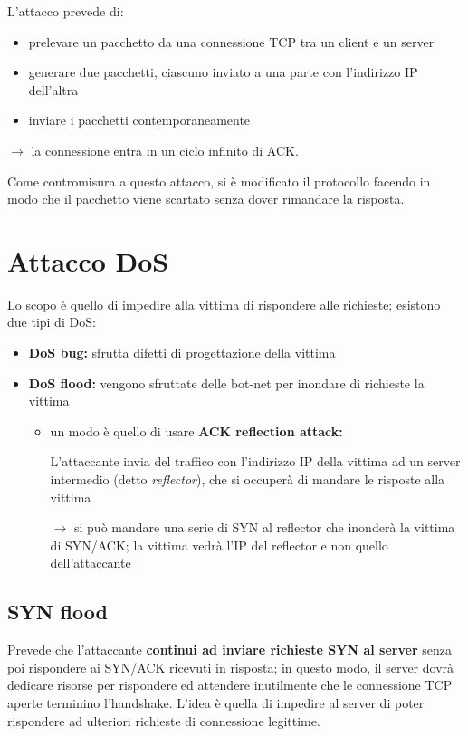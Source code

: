 \noindent L'attacco prevede di:
\begin{itemize}
    \item prelevare un pacchetto da una connessione TCP tra un client e un server 
    \item generare due pacchetti, ciascuno inviato a una parte con l'indirizzo IP dell'altra
    \item inviare i pacchetti contemporaneamente
\end{itemize}

$\rightarrow$ la connessione entra in un ciclo infinito di ACK.

\noindent Come contromisura a questo attacco, si è modificato il protocollo facendo in modo che 
il pacchetto viene scartato senza dover rimandare la risposta.

\section{Attacco DoS}
Lo scopo è quello di impedire alla vittima di rispondere alle richieste; esistono 
due tipi di DoS:
\begin{itemize}
    \item \textbf{DoS bug:} sfrutta difetti di progettazione della vittima 
    \item \textbf{DoS flood:} vengono sfruttate delle bot-net per inondare di richieste la vittima
    \begin{itemize}
        \item un modo è quello di usare \textbf{ACK reflection attack:}
        
        \noindent L'attaccante invia del traffico con l'indirizzo IP della vittima ad un server intermedio (detto \textit{reflector}),
        che si occuperà di mandare le risposte alla vittima 

        $\rightarrow$ si può mandare una serie di SYN al reflector che inonderà la vittima di 
        SYN/ACK; la vittima vedrà l'IP del reflector e non quello dell'attaccante
    \end{itemize}
\end{itemize}

\subsection{SYN flood}
Prevede che l'attaccante \textbf{continui ad inviare richieste SYN al server} senza poi 
rispondere ai SYN/ACK ricevuti in risposta; in questo modo, il server dovrà dedicare risorse per rispondere 
ed attendere inutilmente che le connessione TCP aperte terminino l'handshake. L'idea è quella
di impedire al server di poter rispondere ad ulteriori richieste di connessione legittime.

